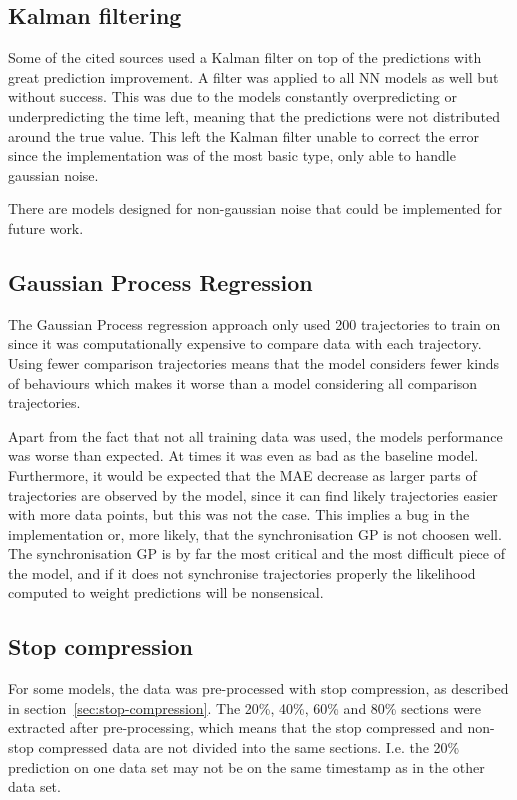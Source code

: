 \subsection{Kalman filtering}
Some of the cited sources used a Kalman filter on top of the predictions with great prediction improvement. A filter was applied to all NN models as well but without success. This was due to the models constantly overpredicting or underpredicting the time left, meaning that the predictions were not distributed around the true value. This left the Kalman filter unable to correct the error since the implementation was of the most basic type, only able to handle gaussian noise. 

There are models designed for non-gaussian noise that could be implemented for future work.

\subsection{Gaussian Process Regression}
The Gaussian Process regression approach only used 200 trajectories to train on since it was computationally expensive to compare data with each trajectory. Using fewer comparison trajectories means that the model considers fewer kinds of behaviours which makes it worse than a model considering all comparison trajectories.

Apart from the fact that not all training data was used, the models performance was worse than expected. At times it was even as bad as the baseline model. Furthermore, it would be expected that the MAE decrease as larger parts of trajectories are observed by the model, since it can find likely trajectories easier with more data points, but this was not the case. This implies a bug in the implementation or, more likely, that the synchronisation GP is not choosen well. The synchronisation GP is by far the most critical and the most difficult piece of the model, and if it does not synchronise trajectories properly the likelihood computed to weight predictions will be nonsensical.

\subsection{Stop compression}
For some models, the data was pre-processed with stop compression, as described in section~\ref{sec:stop-compression}. The 20\%, 40\%, 60\% and 80\% sections were extracted after pre-processing, which means that the stop compressed and non-stop compressed data are not divided into the same sections. I.e. the 20\% prediction on one data set may not be on the same timestamp as in the other data set.

